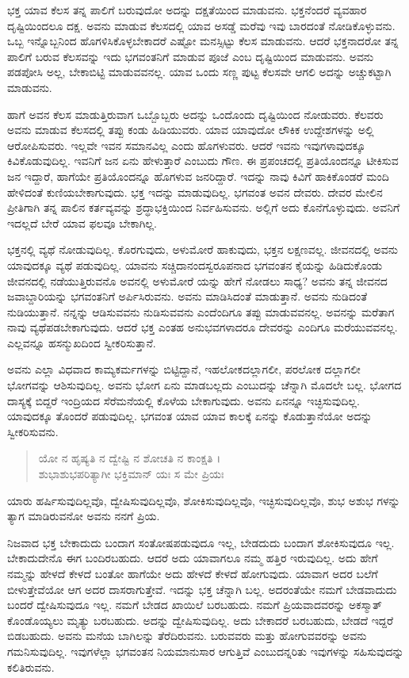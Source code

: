 ಭಕ್ತ ಯಾವ ಕೆಲಸ ತನ್ನ ಪಾಲಿಗೆ ಬರುವುದೋ ಅದನ್ನು ದಕ್ಷತೆಯಿಂದ ಮಾಡುವನು. ಭಕ್ತನೆಂದರೆ ವ್ಯವಹಾರ ದೃಷ್ಟಿಯಿಂದಲೂ ದಕ್ಷ. ಅವನು ಮಾಡುವ ಕೆಲಸದಲ್ಲಿ ಯಾವ ಅಸಡ್ಡೆ ಮರೆವು ಇವು ಬಾರದಂತೆ ನೋಡಿಕೊಳ್ಳುವನು. ಒಬ್ಬ ಇನ್ನೊಬ್ಬನಿಂದ ಹೊಗಳಿಸಿಕೊಳ್ಳಬೇಕಾದರೆ ಎಷ್ಟೋ ಮನಸ್ಸಿಟ್ಟು ಕೆಲಸ ಮಾಡುವನು. ಆದರೆ ಭಕ್ತನಾದರೋ ತನ್ನ ಪಾಲಿಗೆ ಬರುವ ಕೆಲಸವನ್ನು ಇದು ಭಗವಂತನಿಗೆ ಮಾಡುವ ಪೂಜೆ ಎಂಬ ದೃಷ್ಟಿಯಿಂದ ಮಾಡುವನು. ಅವನು ಪಡಪೋಸಿ ಅಲ್ಲ, ಬೇಕಾಬಿಟ್ಟಿ ಮಾಡುವವನಲ್ಲ. ಯಾವ ಒಂದು ಸಣ್ಣ ಪುಟ್ಟ ಕೆಲಸವೇ ಆಗಲಿ ಅದನ್ನು ಅಚ್ಚುಕಟ್ಟಾಗಿ ಮಾಡುವನು.

ಹಾಗೆ ಅವನ ಕೆಲಸ ಮಾಡುತ್ತಿರುವಾಗ ಒಬ್ಬೊಬ್ಬರು ಅದನ್ನು ಒಂದೊಂದು ದೃಷ್ಟಿಯಿಂದ ನೋಡುವರು. ಕೆಲವರು ಅವನು ಮಾಡುವ ಕೆಲಸದಲ್ಲಿ ತಪ್ಪು ಕಂಡು ಹಿಡಿಯುವರು. ಯಾವ ಯಾವುದೋ ಲೌಕಿಕ ಉದ್ದೇಶಗಳನ್ನು ಅಲ್ಲಿ ಆರೋಪಿಸುವರು. ಇಲ್ಲವೇ ಇವನ ಸಮಾನವಿಲ್ಲ ಎಂದು ಹೊಗಳುವರು. ಆದರೆ ಇವನು ಇವುಗಳಾವುದಕ್ಕೂ ಕಿವಿಕೊಡುವುದಿಲ್ಲ. ಇವನಿಗೆ ಜನ ಏನು ಹೇಳುತ್ತಾರೆ ಎಂಬುದು ಗೌಣ. ಈ ಪ್ರಪಂಚದಲ್ಲಿ ಪ್ರತಿಯೊಂದನ್ನೂ ಟೀಕಿಸುವ ಜನ ಇದ್ದಾರೆ, ಹಾಗೆಯೇ ಪ್ರತಿಯೊಂದನ್ನೂ ಹೊಗಳುವ ಜನರಿದ್ದಾರೆ. ಇದನ್ನು ನಾವು ಕಿವಿಗೆ ಹಾಕಿಕೊಂಡರೆ ಮಂದಿ ಹೇಳಿದಂತೆ ಕುಣಿಯಬೇಕಾಗುವುದು. ಭಕ್ತ ಇದನ್ನು ಮಾಡುವುದಿಲ್ಲ. ಭಗವಂತ ಅವನ ದೇವರು. ದೇವರ ಮೇಲಿನ ಪ್ರೀತಿಗಾಗಿ ತನ್ನ ಪಾಲಿನ ಕರ್ತವ್ಯವನ್ನು ಶ್ರದ್ಧಾಭಕ್ತಿಯಿಂದ ನಿರ್ವಹಿಸುವನು. ಅಲ್ಲಿಗೆ ಅದು ಕೊನೆಗೊಳ್ಳುವುದು. ಅವನಿಗೆ ಇದಲ್ಲದೆ ಬೇರೆ ಯಾವ ಫಲವೂ ಬೇಕಾಗಿಲ್ಲ. 

ಭಕ್ತನಲ್ಲಿ ವ್ಯಥೆ ನೋಡುವುದಿಲ್ಲ. ಕೊರಗುವುದು, ಅಳುಮೋರೆ ಹಾಕುವುದು, ಭಕ್ತನ ಲಕ್ಷಣವಲ್ಲ. ಜೀವನದಲ್ಲಿ ಅವನು ಯಾವುದಕ್ಕೂ ವ್ಯಥೆ ಪಡುವುದಿಲ್ಲ. ಯಾವನು ಸಚ್ಚಿದಾನಂದಸ್ವರೂಪನಾದ ಭಗವಂತನ ಕೈಯನ್ನು ಹಿಡಿದುಕೊಂಡು ಜೀವನದಲ್ಲಿ ನಡೆಯುತ್ತಿರುವನೊ ಅವನಲ್ಲಿ ಅಳುಮೋರೆ ಯನ್ನು ಹೇಗೆ ನೋಡಲು ಸಾಧ್ಯ? ಅವನು ತನ್ನ ಜೀವನದ ಜವಾಬ್ದಾರಿಯನ್ನು ಭಗವಂತನಿಗೆ ಅರ್ಪಿಸಿರುವನು. ಅವನು ಮಾಡಿಸಿದಂತೆ ಮಾಡುತ್ತಾನೆ. ಅವನು ನುಡಿದಂತೆ ನುಡಿಯುತ್ತಾನೆ. ನನ್ನನ್ನು ಆಡಿಸುವವನು ನುಡಿಸುವವನು ಎಂದೆಂದಿಗೂ ತಪ್ಪು ಮಾಡುವವನಲ್ಲ. ಅವನನ್ನು ಮರೆತಾಗ ನಾವು ವ್ಯಥೆಪಡಬೇಕಾಗುವುದು. ಆದರೆ ಭಕ್ತ ಎಂತಹ ಅನುಭವಗಳಾದರೂ ದೇವರನ್ನು ಎಂದಿಗೂ ಮರೆಯುವವನಲ್ಲ. ಎಲ್ಲವನ್ನೂ ಹಸನ್ಮುಖದಿಂದ ಸ್ವೀಕರಿಸುತ್ತಾನೆ.

ಅವನು ಎಲ್ಲಾ ವಿಧವಾದ ಕಾಮ್ಯಕರ್ಮಗಳನ್ನು ಬಿಟ್ಟಿದ್ದಾನೆ, ಇಹಲೋಕದಲ್ಲಾಗಲೀ, ಪರಲೋಕ ದಲ್ಲಾಗಲೀ ಭೋಗವನ್ನು ಆಶಿಸುವುದಿಲ್ಲ. ಅವನು ಭೋಗ ಏನು ಮಾಡಬಲ್ಲದು ಎಂಬುದನ್ನು ಚೆನ್ನಾಗಿ ಮೊದಲೇ ಬಲ್ಲ. ಭೋಗದ ದಾಸ್ಯಕ್ಕೆ ಬಿದ್ದರೆ ಇಂದ್ರಿಯದ ಸೆರೆಮನೆಯಲ್ಲಿ ಕೊಳೆಯ ಬೇಕಾಗುವುದು. ಅವನು ಏನನ್ನೂ ಇಚ್ಛಿಸುವುದಿಲ್ಲ. ಯಾವುದಕ್ಕೂ ತೊಂದರೆ ಪಡುವುದಿಲ್ಲ. ಭಗವಂತ ಯಾವ ಯಾವ ಕಾಲಕ್ಕೆ ಏನನ್ನು ಕೊಡುತ್ತಾನೆಯೋ ಅದನ್ನು ಸ್ವೀಕರಿಸುವನು.

\begin{verse}
ಯೋ ನ ಹೃಷ್ಯತಿ ನ ದ್ವೇಷ್ಟಿ ನ ಶೋಚತಿ ನ ಕಾಂಕ್ಷತಿ ।\\ಶುಭಾಶುಭಪರಿತ್ಯಾಗೀ ಭಕ್ತಿಮಾನ್ ಯಃ ಸ ಮೇ ಪ್ರಿಯಃ 
\end{verse}

{\small ಯಾರು ಹರ್ಷಿಸುವುದಿಲ್ಲವೊ, ದ್ವೇಷಿಸುವುದಿಲ್ಲವೊ, ಶೋಕಿಸುವುದಿಲ್ಲವೊ, ಇಚ್ಛಿಸುವುದಿಲ್ಲವೊ, ಶುಭ ಅಶುಭ ಗಳನ್ನು ತ್ಯಾಗ ಮಾಡಿರುವನೋ ಅವನು ನನಗೆ ಪ್ರಿಯ.}

ನಿಜವಾದ ಭಕ್ತ ಬೇಕಾದುದು ಬಂದಾಗ ಸಂತೋಷಪಡುವುದೂ ಇಲ್ಲ, ಬೇಡದುದು ಬಂದಾಗ ಶೋಕಿಸುವುದೂ ಇಲ್ಲ. ಬೇಕಾದುದೇನೊ ಈಗ ಬಂದಿರಬಹುದು. ಆದರೆ ಅದು ಯಾವಾಗಲೂ ನಮ್ಮ ಹತ್ತಿರ ಇರುವುದಿಲ್ಲ. ಅದು ಹೇಗೆ ನಮ್ಮನ್ನು ಹೇಳದೆ ಕೇಳದೆ ಬಂತೋ ಹಾಗೆಯೇ ಅದು ಹೇಳದೆ ಕೇಳದೆ ಹೋಗುವುದು. ಯಾವಾಗ ಅದರ ಬಲೆಗೆ ಬೀಳುತ್ತೇವೆಯೋ ಆಗ ಅದರ ದಾಸರಾಗುತ್ತೇವೆ. ಇದನ್ನು ಭಕ್ತ ಚೆನ್ನಾಗಿ ಬಲ್ಲ. ಅದರಂತೆಯೇ ನಮಗೆ ಬೇಡವಾದುದು ಬಂದರೆ ದ್ವೇಷಿಸುವುದೂ ಇಲ್ಲ. ನಮಗೆ ಬೇಡದ ಖಾಯಿಲೆ ಬರಬಹುದು. ನಮಗೆ ಪ್ರಿಯವಾದವರನ್ನು ಅಕಸ್ಮಾತ್ ಕೊಂಡೊಯ್ಯಲು ಮೃತ್ಯು ಬರಬಹುದು. ಅದನ್ನು ದ್ವೇಷಿಸುವುದಿಲ್ಲ. ಅದು ಬೇಕಾದರೆ ಬರಬಹುದು, ಬೇಡದೆ ಇದ್ದರೆ ಬಿಡಬಹುದು. ಅವನು ಮನೆಯ ಬಾಗಿಲನ್ನು ತೆರೆದಿರುವನು. ಬರುವವರು ಮತ್ತು ಹೋಗುವವರನ್ನು ಅವನು ಗಮನಿಸುವುದಿಲ್ಲ. ಇವುಗಳೆಲ್ಲಾ ಭಗವಂತನ ನಿಯಮಾನುಸಾರ ಆಗುತ್ತಿವೆ ಎಂಬುದನ್ನರಿತು ಇವುಗಳನ್ನು ಸಹಿಸುವುದನ್ನು ಕಲಿತಿರುವನು.

